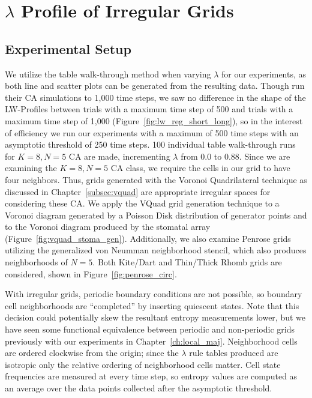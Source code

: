 \documentclass[a4paper,11pt,twoside]{report}
\begin{document}
\section{$\lambda$ Profile of Irregular Grids}

\subsection*{Experimental Setup}

We utilize the table walk-through method when varying $\lambda$ for our experiments, as both line and scatter plots can be generated from the resulting data. Though \citeauthor{wo90} run their CA simulations to 1,000 time steps, we saw no difference in the shape of the LW-Profiles between trials with a maximum time step of 500 and trials with a maximum time step of 1,000 (Figure~\ref{fig:lw_reg_short_long}), so in the interest of efficiency we run our experiments with a maximum of 500 time steps with an asymptotic threshold of 250 time steps. 100 individual table walk-through runs for $K=8, N=5$ CA are made, incrementing $\lambda$ from $0.0$ to $0.88$. Since we are examining the $K=8, N=5$ CA class, we require the cells in our grid to have four neighbors. Thus, grids generated with the Voronoi Quadrilateral technique as discussed in Chapter~\ref{subsec:vquad} are appropriate irregular spaces for considering these CA. We apply the VQuad grid generation technique to a Voronoi diagram generated by a Poisson Disk distribution of generator points and to the Voronoi diagram produced by the stomatal array (Figure~\ref{fig:vquad_stoma_gen}). Additionally, we also examine Penrose grids utilizing the generalized von Neumman neighborhood stencil, which also produces neighborhoods of $N=5$. Both Kite/Dart and Thin/Thick Rhomb grids are considered, shown in Figure~\ref{fig:penrose_circ}.

With irregular grids, periodic boundary conditions are not possible, so boundary cell neighborhoods are ``completed'' by inserting quiescent states. Note that this decision could potentially skew the resultant entropy measurements lower, but we have seen some functional equivalence between periodic and non-periodic grids previously with our experiments in Chapter~\ref{ch:local_maj}. Neighborhood cells are ordered clockwise from the origin; since the $\lambda$ rule tables produced are isotropic only the relative ordering of neighborhood cells matter. Cell state frequencies are measured at every time step, so entropy values are computed as an average over the data points collected after the asymptotic threshold.
\end{document}
